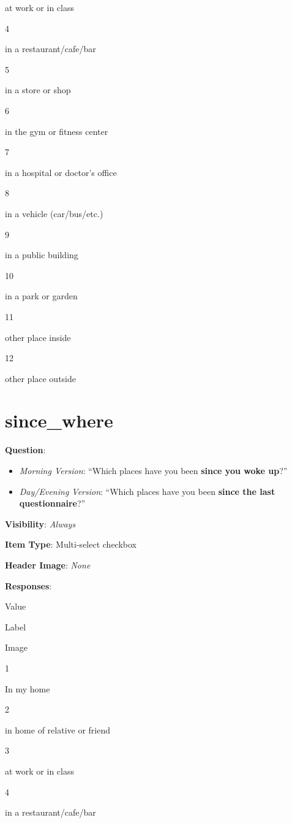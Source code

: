 \documentclass[]{book}
\providecommand{\tightlist}{%
  \setlength{\itemsep}{0pt}\setlength{\parskip}{0pt}}
\begin{document}
at work or in class

4

in a restaurant/cafe/bar

5

in a store or shop

6

in the gym or fitness center

7

in a hospital or doctor's office

8

in a vehicle (car/bus/etc.)

9

in a public building

10

in a park or garden

11

other place inside

12

other place outside

\hypertarget{since_where}{%
\section{since\_where}\label{since_where}}

\textbf{Question}:

\begin{itemize}
\tightlist
\item
  \emph{Morning Version}: ``Which places have you been \textbf{since you woke up}?''
\item
  \emph{Day/Evening Version}: ``Which places have you been \textbf{since the last questionnaire}?''
\end{itemize}

\textbf{Visibility}: \emph{Always}

\textbf{Item Type}: Multi-select checkbox

\textbf{Header Image}: \emph{None}

\textbf{Responses}:

Value

Label

Image

1

In my home

2

in home of relative or friend

3

at work or in class

4

in a restaurant/cafe/bar
\end{document}
